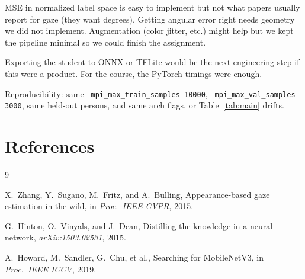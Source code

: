 \documentclass[10pt, reqno, letterpaper, twoside]{amsart}
\begin{document}
MSE in normalized label space is easy to implement but not what papers usually report for gaze (they want degrees). Getting angular error right needs geometry we did not implement. Augmentation (color jitter, etc.) might help but we kept the pipeline minimal so we could finish the assignment.

Exporting the student to ONNX or TFLite would be the next engineering step if this were a product. For the course, the PyTorch timings were enough.

Reproducibility: same \texttt{--mpi\_max\_train\_samples 10000}, \texttt{--mpi\_max\_val\_samples 3000}, same held-out persons, and same arch flags, or Table~\ref{tab:main} drifts.

\section*{References}

\begin{thebibliography}{9}

X.~Zhang, Y.~Sugano, M.~Fritz, and A.~Bulling,
\newblock Appearance-based gaze estimation in the wild,
\newblock in \emph{Proc.\ IEEE CVPR}, 2015.

G.~Hinton, O.~Vinyals, and J.~Dean,
\newblock Distilling the knowledge in a neural network,
\newblock \emph{arXiv:1503.02531}, 2015.

A.~Howard, M.~Sandler, G.~Chu, et al.,
\newblock Searching for MobileNetV3,
\newblock in \emph{Proc.\ IEEE ICCV}, 2019.

\end{thebibliography}
\end{document}
